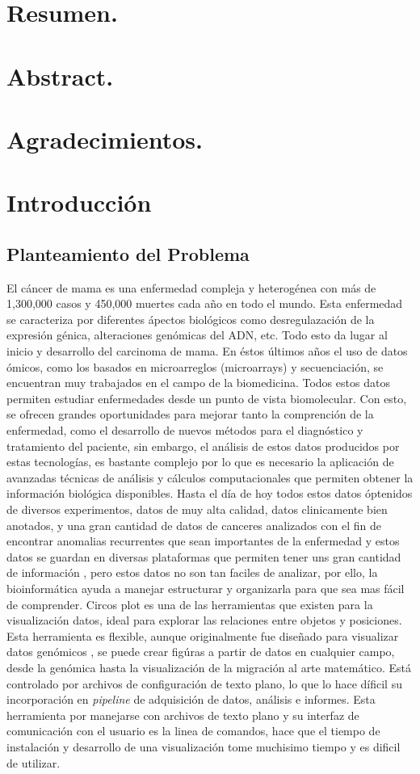 \documentclass[12pt,letterpaper]{article}
\author{Juan Jose Martinez Ulloa}
\begin{document}

\section*{Resumen.}
\section*{Abstract.}
\section*{Agradecimientos.}
\tableofcontents %
\section{Introducción}
\subsection{Planteamiento del Problema}
El cáncer de mama es una enfermedad compleja y heterogénea con más de 1,300,000 casos y 450,000 muertes cada año en todo el mundo. Esta enfermedad se caracteriza por diferentes ápectos biológicos como desregulazación de la expresión génica, alteraciones genómicas del ADN, etc. Todo esto da lugar al inicio y desarrollo del carcinoma de mama. En éstos últimos años el uso de datos ómicos, como los basados en  microarreglos (microarrays) y secuenciación, se encuentran muy trabajados en el campo de la biomedicina. Todos estos datos permiten estudiar enfermedades desde un punto de vista biomolecular. Con esto, se ofrecen grandes oportunidades para mejorar tanto la comprención de la enfermedad, como el desarrollo de nuevos métodos para el diagnóstico y tratamiento del paciente, sin embargo, el análisis de estos datos producidos por estas tecnologías, es bastante complejo por lo que es necesario la aplicación de avanzadas técnicas de análisis y cálculos computacionales que permiten obtener la información biológica disponibles. Hasta el día de hoy todos estos datos óptenidos de diversos experimentos, datos de muy alta calidad, datos clinicamente bien anotados, y una gran cantidad de datos de canceres analizados con el fin de encontrar anomalias recurrentes que sean importantes de la enfermedad y estos datos se guardan en diversas plataformas que permiten tener uns gran cantidad de información , pero estos datos no son tan faciles de analizar, por ello, la bioinformática ayuda a manejar estructurar y organizarla para que sea mas fácil de comprender. Circos plot es una de las herramientas que existen para la visualización datos, ideal para explorar las relaciones entre objetos y posiciones. Esta herramienta es flexible, aunque originalmente fue diseñado para visualizar datos genómicos , se puede crear figúras a partir de datos en cualquier campo, desde la genómica hasta la visualización de la migración al arte matemático. Está controlado por archivos de configuración de texto plano, lo que lo hace díficil su incorporación en \textit{pipeline} de adquisición de datos, análisis e informes. Esta herramienta por manejarse con archivos de texto plano y su interfaz de comunicación con el usuario es la linea de comandos, hace que el tiempo de instalación y desarrollo de una visualización tome muchisimo tiempo y es dificil de utilizar. 
\end{document}
